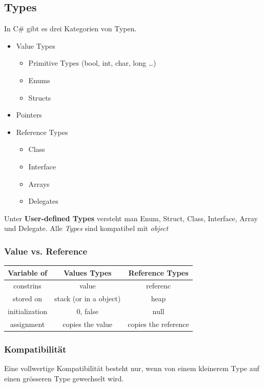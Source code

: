 
\subsection{Types}
In C\# gibt es drei Kategorien von Typen. 
\begin{multicols}{2}
\begin{itemize}
	\item Value Types
	\begin{itemize}
		\item Primitive Types (bool, int, char, long \ldots)
		\item Enums
		\item Structs
	\end{itemize}
	\item Pointers
	\item Reference Types
	\begin{itemize}
		\item Class
		\item Interface
		\item Arrays
		\item Delegates
	\end{itemize}
\end{itemize}
\end{multicols}

Unter \textbf{User-defined Types} versteht man Enum, Struct, Class, Interface, Array und Delegate.
Alle \emph{Types} sind kompatibel mit \emph{object}

\subsubsection{Value vs. Reference}
\begin{tabular}{|c|c|c|}
	\hline
	\textbf{Variable of} & \textbf{Values Types}  & \textbf{Reference Types} \\ \hline
	     constrins       &         value          &         referenc         \\ \hline
	     stored on       & stack (or in a object) &           heap           \\ \hline
	   initialization    &        0, false        &           null           \\ \hline
	     assignment      &    copies the value    &   copies the reference   \\ \hline
\end{tabular} 


\subsubsection{Kompatibilität}
Eine vollwertige Kompatibilität besteht nur, wenn von einem kleinerem Type auf einen grösseren Type gewechselt wird.

